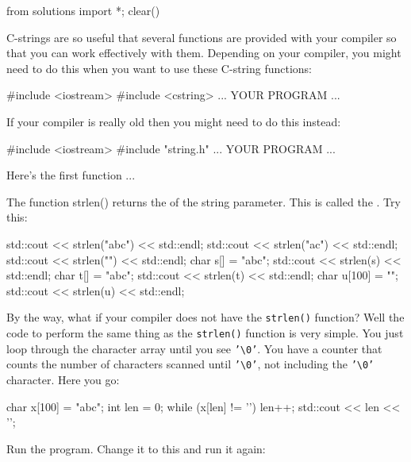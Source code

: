 \begin{python0}
from solutions import *; clear()
\end{python0}

C-strings are so useful that several functions are provided with your compiler so that you can work effectively with them. Depending on your compiler, you might need to do this when you want to use these C-string functions:

\begin{consolethree}[escapeinside=||]
#include <iostream>
#include <cstring>
... YOUR PROGRAM ...
\end{consolethree}

If your compiler is really old then you might need to do this instead:

\begin{consolethree}[escapeinside=||]
#include <iostream>
#include "string.h"
... YOUR PROGRAM ...
\end{consolethree}

Here's the first function ...

The function strlen() returns the  of the string parameter. This is called the . Try this:

\begin{consolethree}[escapeinside=||]
std::cout << strlen("abc") << std::endl;
std::cout << strlen("a\0c") << std::endl;
std::cout << strlen("") << std::endl;
char s[] = "abc";
std::cout << strlen(s) << std::endl;
char t[] = "ab\0c";
std::cout << strlen(t) << std::endl;
char u[100] = "";
std::cout << strlen(u) << std::endl;
\end{consolethree}

By the way, what if your compiler does not have the \verb!strlen()! function? Well the code to perform the same thing as the \verb!strlen()! function is very simple. You just loop through the character array until you see \texttt{'\textbackslash 0'}. You have a counter that counts the number of characters scanned until \texttt{'\textbackslash 0'}, not including the \texttt{'\textbackslash 0'} character. Here you go:

\begin{consolethree}[escapeinside=||]
char x[100] = "abc";
int len = 0;
while (x[len] != '\0')
{
    len++;
}
std::cout << len << '\n';
\end{consolethree}

Run the program. Change it to this and run it again:

